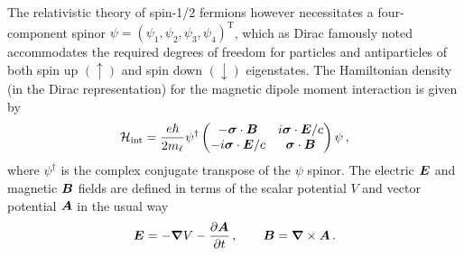 The relativistic theory of spin-1/2 fermions however necessitates a four-component spinor $\psi=(\psi_{1},\psi_{2},\psi_{3},\psi_{4})^\mathrm{T}$, which as Dirac famously noted accommodates the required degrees of freedom for particles and antiparticles of both spin up $(\uparrow)$ and spin down $(\downarrow)$ eigenstates. The Hamiltonian density (in the Dirac representation) for the magnetic dipole moment interaction is given by
\begin{gather}
	\label{pauli:2}
    \mathcal{H}_\mathrm{int} = \frac{e\hbar}{2m_{\ell}}\psi^{\dag}
    \begin{pmatrix}
        -\boldsymbol{\sigma}\cdot\boldsymbol{B} & i\boldsymbol{\sigma}\cdot\boldsymbol{E}/c\\
        -i\boldsymbol{\sigma}\cdot\boldsymbol{E}/c & \boldsymbol{\sigma}\cdot\boldsymbol{B}
    \end{pmatrix}
    \psi\,,
\end{gather}
where $\psi^{\dag}$ is the complex conjugate transpose of the $\psi$ spinor. The electric $\boldsymbol{E}$ and magnetic $\boldsymbol{B}$ fields are defined in terms of the scalar potential $V$ and vector potential $\boldsymbol{A}$ in the usual way
\begin{align}
    \label{eb:1}
    \boldsymbol{E}=-\boldsymbol{\nabla}V-\frac{\partial\boldsymbol{A}}{\partial t}\,,\qquad
    \boldsymbol{B}=\boldsymbol{\nabla}\times\boldsymbol{A}\,.
\end{align}

